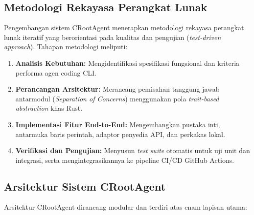 \subsection{Metodologi Rekayasa Perangkat Lunak}
Pengembangan sistem CRootAgent menerapkan metodologi rekayasa perangkat lunak iteratif yang berorientasi pada kualitas dan pengujian (\textit{test-driven approach}). Tahapan metodologi meliputi:
\begin{enumerate}
    \item \textbf{Analisis Kebutuhan:} Mengidentifikasi spesifikasi fungsional dan kriteria performa agen coding CLI.
    \item \textbf{Perancangan Arsitektur:} Merancang pemisahan tanggung jawab antarmodul (\textit{Separation of Concerns}) menggunakan pola \textit{trait-based abstraction} khas Rust.
    \item \textbf{Implementasi Fitur End-to-End:} Mengembangkan pustaka inti, antarmuka baris perintah, adaptor penyedia API, dan perkakas lokal.
    \item \textbf{Verifikasi dan Pengujian:} Menyusun \textit{test suite} otomatis untuk uji unit dan integrasi, serta mengintegrasikannya ke pipeline CI/CD GitHub Actions.
\end{enumerate}

\subsection{Arsitektur Sistem CRootAgent}
Arsitektur CRootAgent dirancang modular dan terdiri atas enam lapisan utama:

